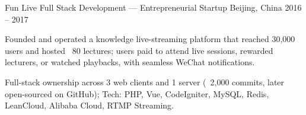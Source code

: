 \begin{cventries}
  \cventry
    {Fun Live} %
    {Full Stack Development --- Entrepreneurial Startup} %
    {Beijing, China} %
    {2016 -- 2017} %
    {
      \begin{cvitems}
        \item {Founded and operated a knowledge live-streaming platform that reached 30,000 users and hosted ~80 lectures; users paid to attend live sessions, rewarded lecturers, or watched playbacks, with seamless WeChat notifications.}
        \item {Full-stack ownership across 3 web clients and 1 server (~2,000 commits, later open-sourced on GitHub); Tech: PHP, Vue, CodeIgniter, MySQL, Redis, LeanCloud, Alibaba Cloud, RTMP Streaming.}
      \end{cvitems}
    }

\end{cventries}
